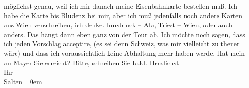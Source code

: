 \begin{ledgroupsized}[t]{13cm}
               möglichst genau, weil ich mir danach meine Eisenbahnkarte bestellen muß. Ich habe die
               Karte bis Bludenz bei mir, aber ich muß
               jedenfalls noch andere Karten aus Wien
               verschreiben, ich denke: Innsbruck – Ala, Triest
               – Wien, oder auch anders. Das hängt dann eben ganz
               von der Tour ab. {\pb}Ich möchte
               noch sagen, dass ich jeden Vorschlag acceptire, (es sei denn Schweiz, was mir vielleicht zu theuer wäre) und dass ich
               voraussichtlich keine Abhaltung mehr haben werde. \pend
           \pstart
           Hat mein \label{K_L03310-1v}\label{K_L03310-1h} an Mayer Sie erreicht? \pend
           \pstart
           Bitte, schreiben Sie bald. \pend
           \pstart
           Herzlichst {\\[\baselineskip]}Ihr {\\[\baselineskip]}\spacefill\mbox{Salten}\pend
           \leftskip=0em{}
         
         \endnumbering{}\end{ledgroupsized}\begin{anhang}\end{anhang}\newcommand{\dateiname}{L03310}\newcommand{\titel}{Felix Salten an Arthur Schnitzler, 14. 8. 1900}\newcommand{\editorInnen}{Martin Anton Müller und Laura Untner}
      